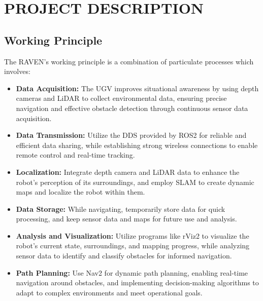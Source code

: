 \newpage


\pagestyle{fancy}
\fancyhf{} 
\fancyhead[L]{{\footnotesize \textbf{\shortprojname}}\hfill{\footnotesize \leftmark}}
\fancyfoot[C]{\thepage}


\chapter{PROJECT DESCRIPTION} \label{chap:ProjDesc}

\section{\fontsize{14}{16} Working Principle}
{
	\fontsize{12}{14}
	The RAVEN’s working principle is a combination of particulate processes which involves:
	
	\begin{itemize}
		\item \textbf{Data Acquisition:} The UGV improves situational awareness by using depth cameras
		and LiDAR to collect environmental data, ensuring precise navigation and effective
		obstacle detection through continuous sensor data acquisition.
		
		\item \textbf{Data Transmission:} Utilize the DDS provided by ROS2 for reliable and efficient data
		sharing, while establishing strong wireless connections to enable remote control and
		real-time tracking.
		
		\item \textbf{Localization:} Integrate depth camera and LiDAR data to enhance the robot's
		perception of its surroundings, and employ SLAM to create dynamic maps and localize
		the robot within them.
		
		\item \textbf{Data Storage:} While navigating, temporarily store data for quick processing, and keep
		sensor data and maps for future use and analysis.
		
		\item \textbf{Analysis and Visualization:} Utilize programs like rViz2 to visualize the robot's current
		state, surroundings, and mapping progress, while analyzing sensor data to identify and
		classify obstacles for informed navigation.
		
		\item \textbf{Path Planning:} Use Nav2 for dynamic path planning, enabling real-time navigation
		around obstacles, and implementing decision-making algorithms to adapt to complex
		environments and meet operational goals.
		

\end{itemize}}
